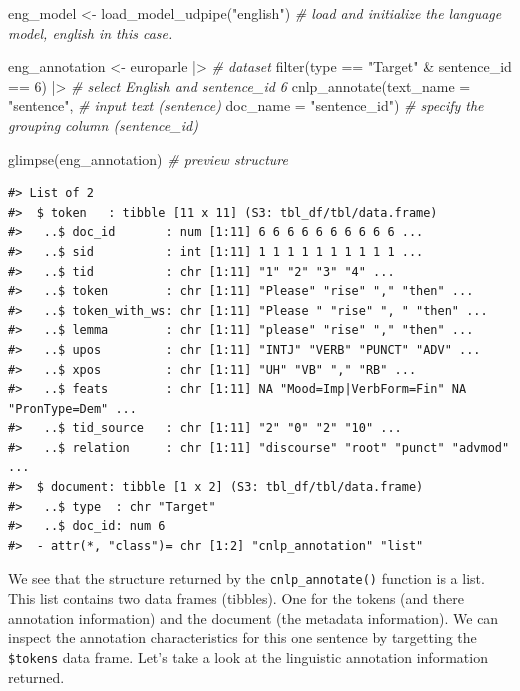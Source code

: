 \documentclass[
  letterpaper,
]{latex/krantz}
\newenvironment{Shaded}{\begin{snugshade}}{\end{snugshade}}
\newcommand{\AttributeTok}[1]{\textcolor[rgb]{0.00,0.00,0.00}{#1}}
\newcommand{\CommentTok}[1]{\textcolor[rgb]{0.00,0.00,0.00}{\textit{#1}}}
\newcommand{\DecValTok}[1]{\textcolor[rgb]{0.00,0.00,0.00}{#1}}
\newcommand{\FunctionTok}[1]{\textcolor[rgb]{0.00,0.00,0.00}{#1}}
\newcommand{\NormalTok}[1]{\textcolor[rgb]{0.00,0.00,0.00}{#1}}
\newcommand{\OtherTok}[1]{\textcolor[rgb]{0.00,0.00,0.00}{#1}}
\newcommand{\SpecialCharTok}[1]{\textcolor[rgb]{0.00,0.00,0.00}{#1}}
\newcommand{\StringTok}[1]{\textcolor[rgb]{0.00,0.00,0.00}{#1}}
\begin{document}
\begin{Shaded}
\begin{Highlighting}[]
\NormalTok{eng\_model }\OtherTok{\textless{}{-}} \FunctionTok{load\_model\_udpipe}\NormalTok{(}\StringTok{"english"}\NormalTok{) }\CommentTok{\# load and initialize the language model, \textquotesingle{}english\textquotesingle{} in this case.}

\NormalTok{eng\_annotation }\OtherTok{\textless{}{-}} 
\NormalTok{  europarle }\SpecialCharTok{|\textgreater{}} \CommentTok{\# dataset }
  \FunctionTok{filter}\NormalTok{(type }\SpecialCharTok{==} \StringTok{"Target"} \SpecialCharTok{\&}\NormalTok{ sentence\_id }\SpecialCharTok{==} \DecValTok{6}\NormalTok{) }\SpecialCharTok{|\textgreater{}} \CommentTok{\# select English and sentence\_id 6}
  \FunctionTok{cnlp\_annotate}\NormalTok{(}\AttributeTok{text\_name =} \StringTok{"sentence"}\NormalTok{, }\CommentTok{\# input text (sentence)}
                \AttributeTok{doc\_name =} \StringTok{"sentence\_id"}\NormalTok{) }\CommentTok{\# specify the grouping column (sentence\_id)}

\FunctionTok{glimpse}\NormalTok{(eng\_annotation) }\CommentTok{\# preview structure}
\end{Highlighting}
\end{Shaded}

\begin{verbatim}
#> List of 2
#>  $ token   : tibble [11 x 11] (S3: tbl_df/tbl/data.frame)
#>   ..$ doc_id       : num [1:11] 6 6 6 6 6 6 6 6 6 6 ...
#>   ..$ sid          : int [1:11] 1 1 1 1 1 1 1 1 1 1 ...
#>   ..$ tid          : chr [1:11] "1" "2" "3" "4" ...
#>   ..$ token        : chr [1:11] "Please" "rise" "," "then" ...
#>   ..$ token_with_ws: chr [1:11] "Please " "rise" ", " "then" ...
#>   ..$ lemma        : chr [1:11] "please" "rise" "," "then" ...
#>   ..$ upos         : chr [1:11] "INTJ" "VERB" "PUNCT" "ADV" ...
#>   ..$ xpos         : chr [1:11] "UH" "VB" "," "RB" ...
#>   ..$ feats        : chr [1:11] NA "Mood=Imp|VerbForm=Fin" NA "PronType=Dem" ...
#>   ..$ tid_source   : chr [1:11] "2" "0" "2" "10" ...
#>   ..$ relation     : chr [1:11] "discourse" "root" "punct" "advmod" ...
#>  $ document: tibble [1 x 2] (S3: tbl_df/tbl/data.frame)
#>   ..$ type  : chr "Target"
#>   ..$ doc_id: num 6
#>  - attr(*, "class")= chr [1:2] "cnlp_annotation" "list"
\end{verbatim}

We see that the structure returned by the \texttt{cnlp\_annotate()}
function is a list. This list contains two data frames (tibbles). One
for the tokens (and there annotation information) and the document (the
metadata information). We can inspect the annotation characteristics for
this one sentence by targetting the \texttt{\$tokens} data frame. Let's
take a look at the linguistic annotation information returned.
\end{document}
